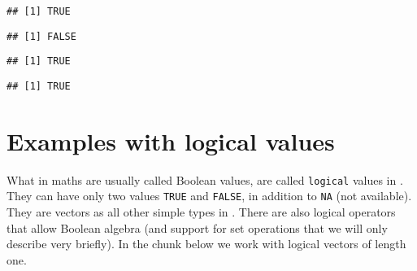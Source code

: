 \documentclass[paper=a4,headsepline,BCOR=12mm,twoside,open=right,%
titlepage,headings=small,fontsize=10pt,index=totoc,bibliography=totoc,%
captions=tableheading,captions=nooneline]{scrbook}\usepackage{knitr}
\begin{document}
\begin{knitrout}\footnotesize
{}\color{fgcolor}\begin{kframe}
\begin{alltt}
\hlstd{(}\hlstd{)}
\end{alltt}
\begin{verbatim}
## [1] TRUE
\end{verbatim}
\begin{alltt}
\hlstd{(}\hlstd{)}
\end{alltt}
\begin{verbatim}
## [1] FALSE
\end{verbatim}
\begin{alltt}
\hlstd{(} \hlopt{/} \hlstd{)}
\end{alltt}
\begin{verbatim}
## [1] TRUE
\end{verbatim}
\begin{alltt}
\hlstd{(} \hlopt{/} \hlstd{)}
\end{alltt}
\begin{verbatim}
## [1] TRUE
\end{verbatim}
\end{kframe}
\end{knitrout}

\section{Examples with logical values}

What in maths are usually called Boolean values, are called \texttt{logical} values in \R. They can have only two values \texttt{TRUE} and \texttt{FALSE}, in addition to \texttt{NA} (not available). They are vectors as all other simple types in \R. There are also logical operators that allow Boolean algebra (and support for set operations that we will only describe very briefly). In the chunk below we work with logical vectors of length one.
\end{document}
